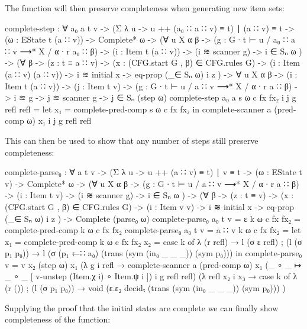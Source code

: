 		The  function will then preserve completeness when
		generating new item sets:

		\begin{code}
			complete-step : ∀ {a₀ a t v} ->
			  (Σ λ u -> u ++ (a₀ ∷ a ∷ v) ≡ t) ∣ (a ∷ v) ≡ t ->
			  (ω : EState t (a ∷ v)) ->
			  Complete* ω ->
			  (∀ {u X α β} ->
			    (g : G ∙ t ⊢ u / a₀ ∷ a ∷ v ⟶* X / α ∙ r a₀ ∷ β) ->
			    (i : Item t (a ∷ v)) -> (i ≋ scanner g) ->
			    i ∈ Sₙ ω
			  ) ->
			  (∀ {β} ->
			    (z : t ≡ a ∷ v) ->
			    (x : (CFG.start G , β) ∈ CFG.rules G) ->
			    (i : Item (a ∷ v) (a ∷ v)) ->
			    i ≋ initial x -> eq-prop (_∈ Sₙ ω) i z
			  ) ->
			  ∀ {u X α β} ->
			  (i : Item t (a ∷ v)) ->
			  (j : Item t v) ->
			  (g : G ∙ t ⊢ u / a ∷ v ⟶* X / α ∙ r a ∷ β) ->
			  i ≋ g ->
			  j ≋ scanner g ->
			    j ∈ Sₙ (step ω)
			complete-step {a₀} {a} s ω c fx fx₂ i j g refl refl =
			  let
			    x₁ = complete-pred-comp s ω c fx fx₂
			  in complete-scanner a (pred-comp ω) x₁ i j g refl refl
		\end{code}

		This can then be used to show that any number of steps still preserve
		completeness:

		\begin{code}
			complete-parse₀ : ∀ {a t v} ->
			  (Σ λ u -> u ++ (a ∷ v) ≡ t) ∣ v ≡ t ->
			  (ω : EState t v) ->
			  Complete* ω ->
			  (∀ {u X α β} ->
			    (g : G ∙ t ⊢ u / a ∷ v ⟶* X / α ∙ r a ∷ β) ->
			    (i : Item t v) -> (i ≋ scanner g) ->
			    i ∈ Sₙ ω
			  ) ->
			  (∀ {β} ->
			    (z : t ≡ v) ->
			    (x : (CFG.start G , β) ∈ CFG.rules G) ->
			    (i : Item v v) ->
			    i ≋ initial x -> eq-prop (_∈ Sₙ ω) i z
			  ) ->
			  Complete (parse₀ ω)
			complete-parse₀ {a₀} {t} {v = ε} k ω c fx fx₂ = complete-pred-comp k ω c fx fx₂
			complete-parse₀ {a₀} {t} {v = a ∷ v} k ω c fx fx₂ =
			  let
			    x₁ = complete-pred-comp k ω c fx fx₂
			    x₂ = case k of
			      λ { (r refl) → l (σ ε refl)
			        ; (l (σ p₁ p₀)) → l (σ (p₁ ←∷ a₀) (trans (sym (in₀ _ _ _)) (sym p₀)))
			        }
			  in
			  complete-parse₀ {v = v} x₂ (step ω) x₁
			    (λ {g i refl → complete-scanner a (pred-comp ω) x₁
			      (_ ∘ _ ↦ _ ∘ _ [ v-unstep (Item.χ i) ∘ Item.ψ i ]) i g refl refl})
			    (λ {refl x₂ i x₃ → case k of
			      λ { (r ())
			        ; (l (σ p₁ p₀)) → void (ε.ε₂ decidₜ (trans (sym (in₀ _ _ _)) (sym p₀)))
			        }
			      })
		\end{code}

		Supplying the proof that the initial states are complete we can finally
		show completeness of the  function:


